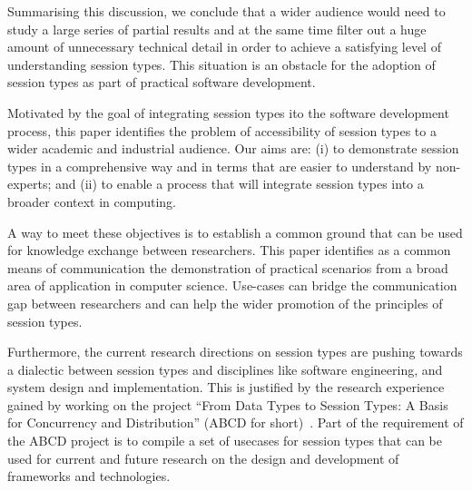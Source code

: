 %
Summarising this discussion, we conclude that a wider
audience would need to study a large series of partial
results and at the same time filter out a huge amount
of unnecessary technical detail in order to achieve a satisfying
level of understanding session types. This situation is an obstacle for the adoption of session types as part of practical software development.


Motivated by the goal of integrating session types ito
the software development process, this paper identifies the problem of accessibility
of session types to a wider academic and industrial audience. 
Our aims are:
(i) to demonstrate session types in a comprehensive way and in
terms that are easier to understand by non-experts; and (ii) to enable a process that will
integrate session types into a broader context in computing.

A way to meet these objectives is to establish a common
ground that can be used for knowledge exchange between researchers.
This paper identifies as a common means of communication the demonstration
of practical scenarios from a broad area of application in computer science.
Use-cases can bridge the communication gap between researchers and can help
the wider promotion of the principles of session types.

Furthermore, the current research directions on session types are
pushing towards a dialectic between session types and disciplines
like software engineering, and system design and implementation.
This is justified by the research experience gained by working
on the project
``From Data Types to Session Types: A Basis for Concurrency and Distribution''
(ABCD for short)~\cite{ABCD}.
Part of the requirement of the ABCD project is to compile a set of usecases
for session types that can be used for current and future research on
the design and development of frameworks and technologies.

